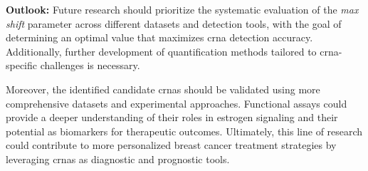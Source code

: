\textbf{Outlook:}
Future research should prioritize the systematic evaluation of the \textit{max
    shift} parameter across different datasets and detection tools, with the goal
of determining an optimal value that maximizes \gls{crna} detection accuracy.
Additionally, further development of quantification methods tailored to
\gls{crna}-specific challenges is necessary.

Moreover, the identified candidate \glspl{crna} should be validated using more
comprehensive datasets and experimental approaches.
Functional assays could provide a deeper understanding of their roles in
estrogen signaling and their potential as biomarkers for therapeutic outcomes.
Ultimately, this line of research could contribute to more personalized breast
cancer treatment strategies by leveraging \glspl{crna} as diagnostic and
prognostic tools.
